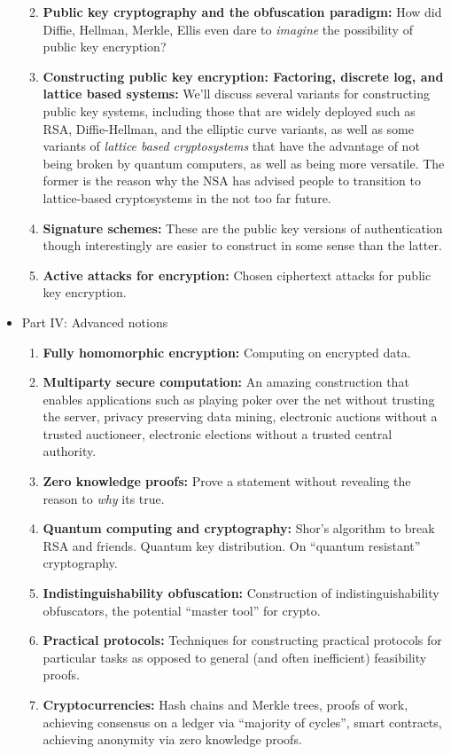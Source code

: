 \begin{itemize}
  \begin{enumerate}
  \def\labelenumi{\arabic{enumi}.}
  \item
    \textbf{Public key cryptography and the obfuscation paradigm:} How
    did Diffie, Hellman, Merkle, Ellis even dare to \emph{imagine} the
    possibility of public key encryption?
  \item
    \textbf{Constructing public key encryption: Factoring, discrete log,
    and lattice based systems:} We'll discuss several variants for
    constructing public key systems, including those that are widely
    deployed such as RSA, Diffie-Hellman, and the elliptic curve
    variants, as well as some variants of \emph{lattice based
    cryptosystems} that have the advantage of not being broken by
    quantum computers, as well as being more versatile. The former is
    the reason why the NSA has advised people to transition to
    lattice-based cryptosystems in the not too far future.
  \item
    \textbf{Signature schemes:} These are the public key versions of
    authentication though interestingly are easier to construct in some
    sense than the latter.
  \item
    \textbf{Active attacks for encryption:} Chosen ciphertext attacks
    for public key encryption.
  \end{enumerate}
\item
  Part IV: Advanced notions

  \begin{enumerate}
  \def\labelenumi{\arabic{enumi}.}
  \item
    \textbf{Fully homomorphic encryption:} Computing on encrypted data.
  \item
    \textbf{Multiparty secure computation:} An amazing construction that
    enables applications such as playing poker over the net without
    trusting the server, privacy preserving data mining, electronic
    auctions without a trusted auctioneer, electronic elections without
    a trusted central authority.
  \item
    \textbf{Zero knowledge proofs:} Prove a statement without revealing
    the reason to \emph{why} its true.
  \item
    \textbf{Quantum computing and cryptography:} Shor's algorithm to
    break RSA and friends. Quantum key distribution. On ``quantum
    resistant'' cryptography.
  \item
    \textbf{Indistinguishability obfuscation:} Construction of
    indistinguishability obfuscators, the potential ``master tool'' for
    crypto.
  \item
    \textbf{Practical protocols:} Techniques for constructing practical
    protocols for particular tasks as opposed to general (and often
    inefficient) feasibility proofs.
  \item
    \textbf{Cryptocurrencies:} Hash chains and Merkle trees, proofs of
    work, achieving consensus on a ledger via ``majority of cycles'',
    smart contracts, achieving anonymity via zero knowledge proofs.
  \end{enumerate}
\end{itemize}

